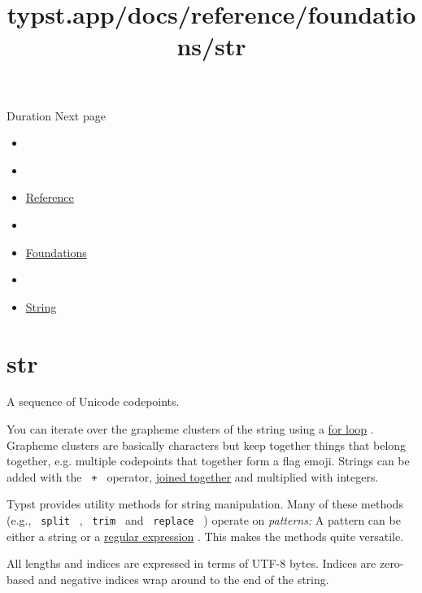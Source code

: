 \href{/docs/reference/foundations/duration/}{\pandocbounded{}}

{ Duration } { Next page }


\title{typst.app/docs/reference/foundations/str}

\begin{itemize}
\tightlist
\item
  \href{/docs}{}
\item
  
\item
  \href{/docs/reference/}{Reference}
\item
  
\item
  \href{/docs/reference/foundations/}{Foundations}
\item
  
\item
  \href{/docs/reference/foundations/str/}{String}
\end{itemize}

\section{\texorpdfstring{{ str }}{ str }}\label{summary}

A sequence of Unicode codepoints.

You can iterate over the grapheme clusters of the string using a
\href{/docs/reference/scripting/\#loops}{for loop} . Grapheme clusters
are basically characters but keep together things that belong together,
e.g. multiple codepoints that together form a flag emoji. Strings can be
added with the \texttt{\ +\ } operator,
\href{/docs/reference/scripting/\#blocks}{joined together} and
multiplied with integers.

Typst provides utility methods for string manipulation. Many of these
methods (e.g., \texttt{\ split\ } , \texttt{\ trim\ } and
\texttt{\ replace\ } ) operate on \emph{patterns:} A pattern can be
either a string or a \href{/docs/reference/foundations/regex/}{regular
expression} . This makes the methods quite versatile.

All lengths and indices are expressed in terms of UTF-8 bytes. Indices
are zero-based and negative indices wrap around to the end of the
string.


